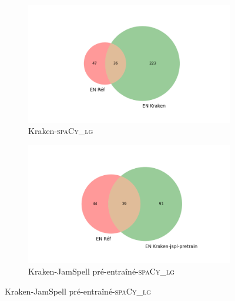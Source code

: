 \begin{figure}[H]
\begin{minipage}{7cm}
  \begin{subfigure}{1\textwidth}
  \includegraphics[width=1\textwidth]{IMAGES/ELTeC_INTERSECTIONS_spaCy3.5.1/TROLLOPE_Adventure_Kraken.txt_spacy-lg-concat.json_intersection.png} 
  \caption{Kraken-\textsc{spaCy\_lg}}
  \label{fig:TROLLOP_DIST_KRAKENBASE_LG}
  \end{subfigure}
  \end{minipage}
  \begin{minipage}{7cm}
  \begin{subfigure}{1\textwidth}
  \includegraphics[width=1\textwidth]{IMAGES/ELTeC_INTERSECTIONS_spaCy3.5.1/TROLLOPE_Adventure_Kraken_jamspell-cor.txt_spacy-lg-concat.json_intersection.png}
   \caption{Kraken-JamSpell pré-entraîné-\textsc{spaCy\_lg}}
 

\end{subfigure}
\end{minipage}
\end{figure}

